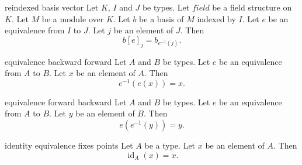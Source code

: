 \begin{cleanresult}{reindexed basis vector}
Let $K$, $I$ and $J$ be types.
Let $\mathit{field}$ be a field structure on $K$.
Let $M$ be a module over $K$.
Let $b$ be a basis of $M$ indexed by $I$.
Let $e$ be an equivalence from $I$ to $J$.
Let $j$ be an element of $J$.
Then \[b[e]_{j} = b_{e^{-1}(j)}.\]
\par{}
\end{cleanresult}

\begin{cleanresult}{equivalence backward forward}
Let $A$ and $B$ be types.
Let $e$ be an equivalence from $A$ to $B$.
Let $x$ be an element of $A$.
Then \[e^{-1}(e(x)) = x.\]
\par{}
\end{cleanresult}

\begin{cleanresult}{equivalence forward backward}
Let $A$ and $B$ be types.
Let $e$ be an equivalence from $A$ to $B$.
Let $y$ be an element of $B$.
Then \[e(e^{-1}(y)) = y.\]
\par{}
\end{cleanresult}

\begin{cleanresult}{identity equivalence fixes points}
Let $A$ be a type.
Let $x$ be an element of $A$.
Then \[\operatorname{id}_{A}(x) = x.\]
\par{}
\end{cleanresult}

